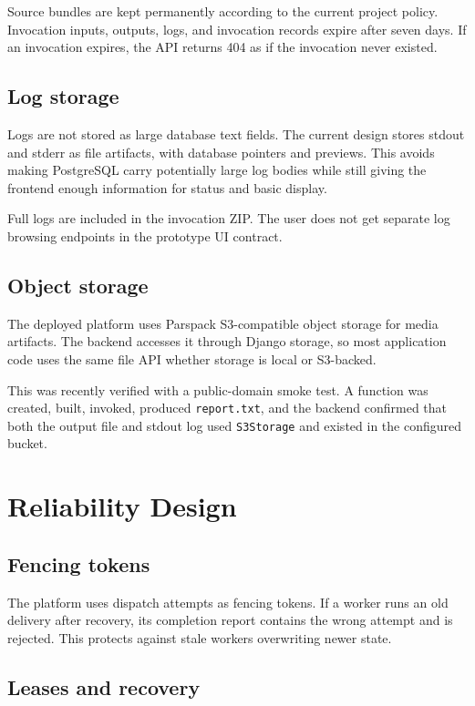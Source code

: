 \documentclass[12pt,a4paper]{report}
\newcommand{\service}[1]{\texttt{#1}}
\newcommand{\file}[1]{\texttt{#1}}
\begin{document}
Source bundles are kept permanently according to the current project policy.
Invocation inputs, outputs, logs, and invocation records expire after seven
days. If an invocation expires, the API returns 404 as if the invocation never
existed.

\section{Log storage}

Logs are not stored as large database text fields. The current design stores
stdout and stderr as file artifacts, with database pointers and previews. This
avoids making PostgreSQL carry potentially large log bodies while still giving
the frontend enough information for status and basic display.

Full logs are included in the invocation ZIP. The user does not get separate
log browsing endpoints in the prototype UI contract.

\section{Object storage}

The deployed platform uses Parspack S3-compatible object storage for media
artifacts. The backend accesses it through Django storage, so most application
code uses the same file API whether storage is local or S3-backed.

This was recently verified with a public-domain smoke test. A function was
created, built, invoked, produced \file{report.txt}, and the backend confirmed
that both the output file and stdout log used \service{S3Storage} and existed
in the configured bucket.

\clearpage

\chapter{Reliability Design}

\section{Fencing tokens}

The platform uses dispatch attempts as fencing tokens. If a worker runs an old
delivery after recovery, its completion report contains the wrong attempt and
is rejected. This protects against stale workers overwriting newer state.

\section{Leases and recovery}
\end{document}
